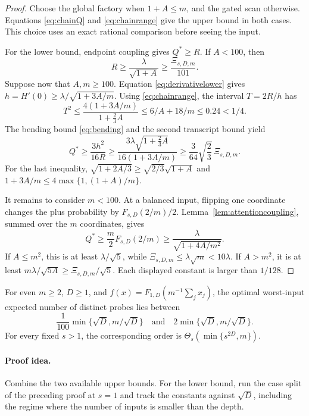 \begin{proof}
Choose the global factory when \(1+A\le m\), and the gated scan
otherwise. Equations \eqref{eq:chainQ} and \eqref{eq:chainrange}
give the upper bound in both cases.
This choice uses an exact rational comparison before seeing the input.

For the lower bound, endpoint coupling gives \(Q^*\ge R\).
If \(A<100\), then
\[
R\ge\frac{\lambda}{\sqrt{1+A}}
\ge\frac{\Xi_{s,D,m}}{101}.
\]
Suppose now that \(A,m\ge100\).
Equation \eqref{eq:derivativelower} gives
\(h=H'(0)\ge\lambda/\sqrt{1+3A/m}\).
Using \eqref{eq:chainrange}, the interval \(T=2R/h\) has
\[
T^2\le\frac{4(1+3A/m)}{1+\frac23A}
\le6/A+18/m\le0.24<1/4.
\]
The bending bound \eqref{eq:bending} and the second transcript
bound yield
\[
Q^*\ge\frac{3h^2}{16R}
\ge\frac{3\lambda\sqrt{1+\frac23A}}{16(1+3A/m)}
\ge\frac{3}{64}\sqrt{\frac23}\,\Xi_{s,D,m}.
\]
For the last inequality,
\(\sqrt{1+2A/3}\ge\sqrt{2/3}\sqrt{1+A}\) and
\(1+3A/m\le4\max\{1,(1+A)/m\}\).

It remains to consider \(m<100\).
At a balanced input, flipping one coordinate changes the plus
probability by \(F_{s,D}(2/m)/2\). Lemma~\ref{lem:attentioncoupling},
summed over the \(m\) coordinates, gives
\[
Q^*\ge\frac m2F_{s,D}(2/m)
\ge\frac{\lambda}{\sqrt{1+4A/m^2}}.
\]
If \(A\le m^2\), this is at least \(\lambda/\sqrt5\), while
\(\Xi_{s,D,m}\le\lambda\sqrt m<10\lambda\).
If \(A>m^2\), it is at least
\(m\lambda/\sqrt{5A}\ge\Xi_{s,D,m}/\sqrt5\).
Each displayed constant is larger than \(1/128\).
\end{proof}

\begin{theorem}\label{thm:finitecritical}
For even \(m\ge2\), \(D\ge1\), and
\(f(x)=F_{1,D}(m^{-1}\sum_jx_j)\), the optimal worst-input
expected number of distinct probes lies between
\[
\frac1{100}\min\{\sqrt D,m/\sqrt D\}
\quad\text{and}\quad
2\min\{\sqrt D,m/\sqrt D\}.
\]
For every fixed \(s>1\), the corresponding order is
\(\Theta_s(\min\{s^{2D},m\})\).
\end{theorem}
\paragraph{Proof idea.}
Combine the two available upper bounds. For the lower bound, run the
case split of the preceding proof at \(s=1\) and track the constants
against \(\sqrt D\), including the regime where the number of inputs
is smaller than the depth.

